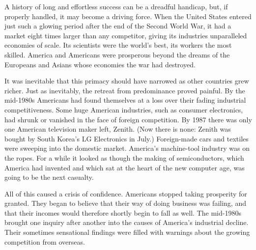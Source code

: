\documentclass[a4paper]{article}
\begin{document}
\par
A history of long and effortless success can be a dreadful handicap, but, if properly handled, it may become a driving force. When the United States entered just such a glowing period after the end of the Second World War, it had a market eight times larger than any competitor, giving its industries unparalleled economies of scale. Its scientists were the world’s best, its workers the most skilled. America and Americans were prosperous beyond the dreams of the Europeans and Asians whose economies the war had destroyed.

\par
It was inevitable that this primacy should have narrowed as other countries grew richer. Just as inevitably, the retreat from predominance proved painful. By the mid-1980s Americans had found themselves at a loss over their fading industrial competitiveness. Some huge American industries, such as consumer electronics, had shrunk or vanished in the face of foreign competition. By 1987 there was only one American television maker left, Zenith. (Now there is none: Zenith was bought by South Korea’s LG Electronics in July.) Foreign-made cars and textiles were sweeping into the domestic market. America’s machine-tool industry was on the ropes. For a while it looked as though the making of semiconductors, which America had invented and which sat at the heart of the new computer age, was going to be the next casualty.

\par
All of this caused a crisis of confidence. Americans stopped taking prosperity for granted. They began to believe that their way of doing business was failing, and that their incomes would therefore shortly begin to fall as well. The mid-1980s brought one inquiry after another into the causes of America’s industrial decline. Their sometimes sensational findings were filled with warnings about the growing competition from overseas.
\end{document}
